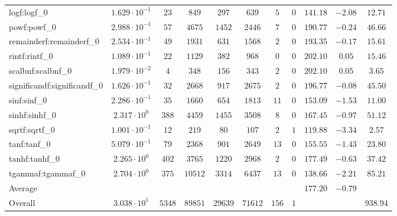 \begin{tabular}{|l|c|c|c|c|c|c|c|c|c|c|}
logf:logf\_0                 & $ 1.629 \cdot 10^{-1} $ & $ 23     $ & $ 849   $ & $ 297   $ & $ 639   $ & $ 5   $ & $ 0 $ & $ 141.18      $ & $ -2.08   $ & $ 12.71   $ \\
powf:powf\_0                 & $ 2.988 \cdot 10^{-1} $ & $ 57     $ & $ 4675  $ & $ 1452  $ & $ 2446  $ & $ 7   $ & $ 0 $ & $ 190.77      $ & $ -0.24   $ & $ 46.66   $ \\
remainderf:remainderf\_0     & $ 2.534 \cdot 10^{-1} $ & $ 49     $ & $ 1931  $ & $ 631   $ & $ 1568  $ & $ 2   $ & $ 0 $ & $ 193.35      $ & $ -0.17   $ & $ 15.61   $ \\
rintf:rintf\_0               & $ 1.089 \cdot 10^{-1} $ & $ 22     $ & $ 1129  $ & $ 382   $ & $ 968   $ & $ 0   $ & $ 0 $ & $ 202.10      $ & $ 0.05    $ & $ 15.46   $ \\
scalbnf:scalbnf\_0           & $ 1.979 \cdot 10^{-2} $ & $ 4      $ & $ 348   $ & $ 156   $ & $ 343   $ & $ 2   $ & $ 0 $ & $ 202.10      $ & $ 0.05    $ & $ 3.65    $ \\
significandf:significandf\_0 & $ 1.626 \cdot 10^{-1} $ & $ 32     $ & $ 2668  $ & $ 917   $ & $ 2675  $ & $ 2   $ & $ 0 $ & $ 196.77      $ & $ -0.08   $ & $ 45.50   $ \\
sinf:sinf\_0                 & $ 2.286 \cdot 10^{-1} $ & $ 35     $ & $ 1660  $ & $ 654   $ & $ 1813  $ & $ 11  $ & $ 0 $ & $ 153.09      $ & $ -1.53   $ & $ 11.00   $ \\
sinhf:sinhf\_0               & $ 2.317 \cdot 10^{0}  $ & $ 388    $ & $ 4459  $ & $ 1455  $ & $ 3508  $ & $ 8   $ & $ 0 $ & $ 167.45      $ & $ -0.97   $ & $ 51.12   $ \\
sqrtf:sqrtf\_0               & $ 1.001 \cdot 10^{-1} $ & $ 12     $ & $ 219   $ & $ 80    $ & $ 107   $ & $ 2   $ & $ 1 $ & $ 119.88      $ & $ -3.34   $ & $ 2.57    $ \\
tanf:tanf\_0                 & $ 5.079 \cdot 10^{-1} $ & $ 79     $ & $ 2368  $ & $ 901   $ & $ 2649  $ & $ 13  $ & $ 0 $ & $ 155.55      $ & $ -1.43   $ & $ 23.80   $ \\
tanhf:tanhf\_0               & $ 2.265 \cdot 10^{0}  $ & $ 402    $ & $ 3765  $ & $ 1220  $ & $ 2968  $ & $ 2   $ & $ 0 $ & $ 177.49      $ & $ -0.63   $ & $ 37.42   $ \\
tgammaf:tgammaf\_0           & $ 2.704 \cdot 10^{0}  $ & $ 375    $ & $ 10512 $ & $ 3314  $ & $ 6437  $ & $ 13  $ & $ 0 $ & $ 138.66      $ & $ -2.21   $ & $ 85.21   $ \\
\hline
Average                      & $                     $ & $        $ & $       $ & $       $ & $       $ & $     $ & $   $ & $ 177.20      $ & $ -0.79   $ & $         $ \\
\hline
Overall                      & $ 3.038 \cdot 10^{1}  $ & $ 5348   $ & $ 89851 $ & $ 29639 $ & $ 71612 $ & $ 156 $ & $ 1 $ & $             $ & $         $ & $ 938.94  $ \\
\hline
\end{tabular}
